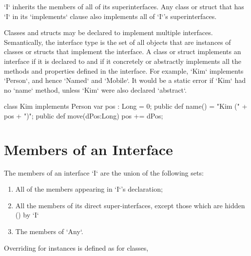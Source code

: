 \xcd`I` inherits the members of all of its superinterfaces. Any class or
struct that has \xcd`I` in its \xcd`implements` clause also implements all of
\xcd`I`'s superinterfaces. 


Classes and structs may be declared to implement multiple interfaces. Semantically, the
interface type is the set of all objects that are instances of classes
or structs that
implement the interface. A class or struct implements an interface if it is declared to
and if it concretely or abstractly implements all the methods and properties
defined in the interface. For example, \xcd`Kim` implements
\xcd`Person`, and hence \xcd`Named` and \xcd`Mobile`. It would be a static
error if \xcd`Kim` had no \xcd`name` method, unless \xcd`Kim` were also
declared \xcd`abstract`.

\begin{xten}
class Kim implements Person {
   var pos : Long = 0;
   public def name() = "Kim (" + pos + ")";
   public def move(dPos:Long) { pos += dPos; }
}
\end{xten}
%






\section{Members of an Interface}

The members of an interface \xcd`I` are the union of the following sets: 
\begin{enumerate}
\item All of the members appearing in \xcd`I`'s declaration;
\item All the members of its direct super-interfaces, except those which are
      hidden () by \xcd`I`
\item The members of \xcd`Any`.
\end{enumerate}

Overriding for instances is defined as for classes, 
